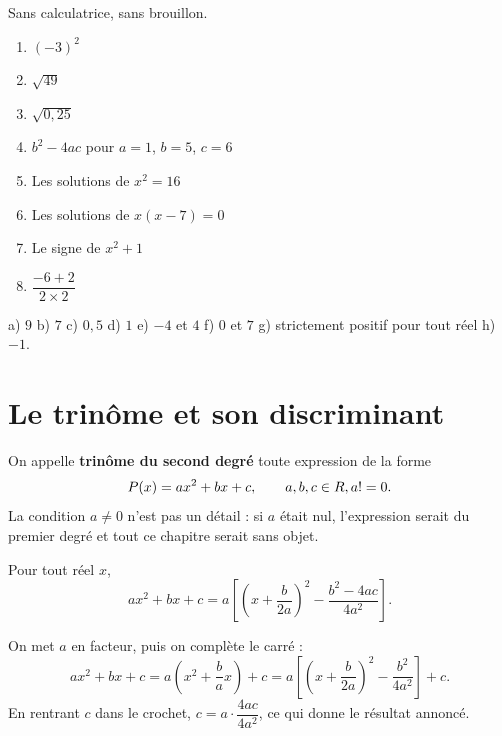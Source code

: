\begin{automatismes}
Sans calculatrice, sans brouillon.

\begin{enumerate}[label=\textbf{\alph*)}, leftmargin=*, itemsep=0.25em]
  \item $(-3)^{2}$
  \item $\sqrt{49}$
  \item $\sqrt{0{,}25}$
  \item $b^{2}-4ac$ pour $a=1$, $b=5$, $c=6$
  \item Les solutions de $x^{2} = 16$
  \item Les solutions de $x(x-7) = 0$
  \item Le signe de $x^{2}+1$
  \item $\dfrac{-6+2}{2\times 2}$
\end{enumerate}
\end{automatismes}

\begin{corrige}[automatismes]
a) $9$ \quad b) $7$ \quad c) $0{,}5$ \quad d) $1$ \quad e) $-4$ et $4$ \quad
f) $0$ et $7$ \quad g) strictement positif pour tout réel \quad
h) $-1$.
\end{corrige}

\section{Le trinôme et son discriminant}

\begin{definition}
On appelle \textbf{trinôme du second degré} toute expression de la forme
\[
  P(x) = ax^{2}+bx+c, \qquad a,b,c \in R,  a != 0 .
\]
La condition $a \neq 0$ n'est pas un détail : si $a$ était nul, l'expression
serait du premier degré et tout ce chapitre serait sans objet.
\end{definition}

\begin{propriete}
Pour tout réel $x$,
\[
  ax^{2}+bx+c
  = a\left[\left(x+\frac{b}{2a}\right)^{\!2}-\frac{b^{2}-4ac}{4a^{2}}\right].
\]
\end{propriete}

\begin{demonstration}
On met $a$ en facteur, puis on complète le carré :
\[
  ax^{2}+bx+c = a\left(x^{2}+\frac{b}{a}x\right)+c
  = a\left[\left(x+\frac{b}{2a}\right)^{\!2}-\frac{b^{2}}{4a^{2}}\right]+c .
\]
En rentrant $c$ dans le crochet, $c = a\cdot\dfrac{4ac}{4a^{2}}$, ce qui donne
le résultat annoncé.
\end{demonstration}

